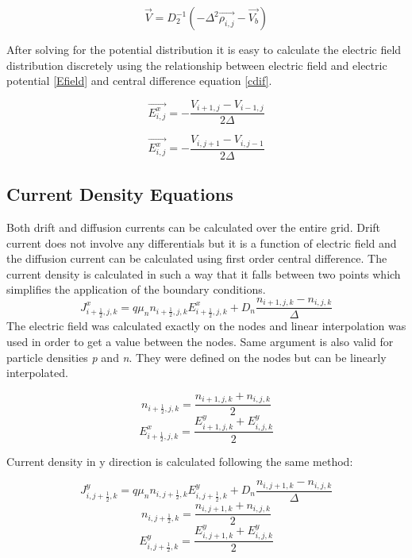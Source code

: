 \begin{equation}
\vec{V}=D_{2}^{-1}(-\Delta^2\vec{\rho_{i,j}}-\vec{V_b})
\end{equation}

After solving for the potential distribution it is easy to calculate the electric field distribution discretely using the relationship between electric field and electric potential \eqref{Efield} and central difference equation \eqref{cdif}. 

\begin{equation}
\vec{E^x_{i,j}}=-\frac{V_{i+1,j}-V_{i-1,j}}{2\Delta}
\end{equation}

\begin{equation}
\vec{E^x_{i,j}}=-\frac{V_{i,j+1}-V_{i,j-1}}{2\Delta}
\end{equation}

\clearpage
\subsection{Current Density Equations}
 Both drift and diffusion currents can be calculated over the entire grid. Drift current does not involve any differentials but it is a function of electric field and the diffusion current can be calculated using first order central difference. The current density is calculated in such a way that it falls between two points which simplifies the application of the boundary conditions.
\begin{equation}
J^x_{i+\frac{1}{2},j,k}=q\mu_n n_{i+\frac{1}{2},j,k} E^x_{i+\frac{1}{2},j,k}+D_n \frac{n_{i+1,j,k}-n_{i,j,k}}{\Delta}
\end{equation}
The electric field was calculated exactly on the nodes and linear interpolation was used in order to get a value between the nodes. Same argument is also valid for particle densities \textit{p} and \textit{n}. They were defined on the nodes but can be linearly interpolated.

\begin{equation}\nonumber
n_{i+\frac{1}{2},j,k}=\frac{n_{i+1,j,k}+n_{i,j,k}}{2}
\end{equation}
\begin{equation}\nonumber
E^{x}_{i+\frac{1}{2},j,k}=\frac{E^y_{i+1,j,k}+E^y_{i,j,k}}{2}
\end{equation}

Current density in y direction is calculated following the same method:

\begin{equation}
J^y_{i,j+\frac{1}{2},k}=q\mu_n n_{i,j+\frac{1}{2},k} E^y_{i,j+\frac{1}{2},k}+D_n \frac{n_{i,j+1,k}-n_{i,j,k}}{\Delta}
\end{equation}
\begin{equation}\nonumber
n_{i,j+\frac{1}{2},k}=\frac{n_{i,j+1,k}+n_{i,j,k}}{2}
\end{equation}
\begin{equation}\nonumber
E^{y}_{i,j+\frac{1}{2},k}=\frac{E^y_{i,j+1,k}+E^y_{i,j,k}}{2}
\end{equation}

